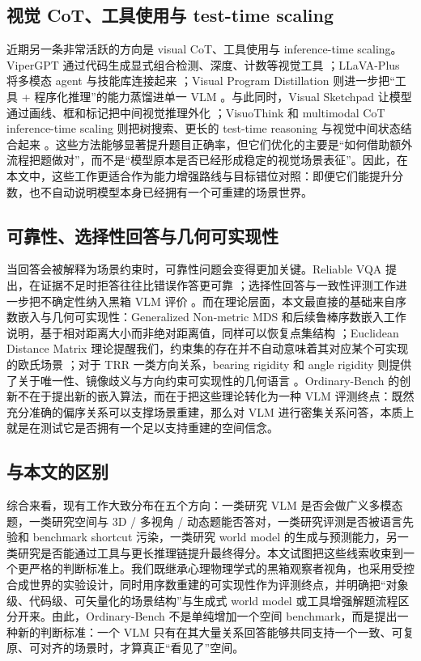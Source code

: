 \subsection{视觉 CoT、工具使用与 test-time scaling}

近期另一条非常活跃的方向是 visual CoT、工具使用与 inference-time scaling。ViperGPT 通过代码生成显式组合检测、深度、计数等视觉工具 \cite{suris2023vipergpt}；LLaVA-Plus 将多模态 agent 与技能库连接起来 \cite{liu2023llavaplus}；Visual Program Distillation 则进一步把“工具 + 程序化推理”的能力蒸馏进单一 VLM \cite{gui2024vpd}。与此同时，Visual Sketchpad 让模型通过画线、框和标记把中间视觉推理外化 \cite{hu2024visualsketchpad}；VisuoThink 和 multimodal CoT inference-time scaling 则把树搜索、更长的 test-time reasoning 与视觉中间状态结合起来 \cite{wang2025visuothink,lin2025multimodalcot}。这些方法能够显著提升题目正确率，但它们优化的主要是“如何借助额外流程把题做对”，而不是“模型原本是否已经形成稳定的视觉场景表征”。因此，在本文中，这些工作更适合作为能力增强路线与目标错位对照：即便它们能提升分数，也不自动说明模型本身已经拥有一个可重建的场景世界。

\subsection{可靠性、选择性回答与几何可实现性}

当回答会被解释为场景约束时，可靠性问题会变得更加关键。Reliable VQA 提出，在证据不足时拒答往往比错误作答更可靠 \cite{whitehead2022reliablevqa}；选择性回答与一致性评测工作进一步把不确定性纳入黑箱 VLM 评价 \cite{eisenschlos2024selectivevqa,khan2024consistency}。而在理论层面，本文最直接的基础来自序数嵌入与几何可实现性：Generalized Non-metric MDS 和后续鲁棒序数嵌入工作说明，基于相对距离大小而非绝对距离值，同样可以恢复点集结构 \cite{agarwal2007gnmds,ma2018robustordinal}；Euclidean Distance Matrix 理论提醒我们，约束集的存在并不自动意味着其对应某个可实现的欧氏场景 \cite{dokmanic2015edm}；对于 TRR 一类方向关系，bearing rigidity 和 angle rigidity 则提供了关于唯一性、镜像歧义与方向约束可实现性的几何语言 \cite{zhao2019bearingrigidity,chen2021anglerigidity}。Ordinary-Bench 的创新不在于提出新的嵌入算法，而在于把这些理论转化为一种 VLM 评测终点：既然充分准确的偏序关系可以支撑场景重建，那么对 VLM 进行密集关系问答，本质上就是在测试它是否拥有一个足以支持重建的空间信念。

\subsection{与本文的区别}

综合来看，现有工作大致分布在五个方向：一类研究 VLM 是否会做广义多模态题，一类研究空间与 3D / 多视角 / 动态题能否答对，一类研究评测是否被语言先验和 benchmark shortcut 污染，一类研究 world model 的生成与预测能力，另一类研究是否能通过工具与更长推理链提升最终得分。本文试图把这些线索收束到一个更严格的判断标准上。我们既继承心理物理学式的黑箱观察者视角，也采用受控合成世界的实验设计，同时用序数重建的可实现性作为评测终点，并明确把“对象级、代码级、可矢量化的场景结构”与生成式 world model 或工具增强解题流程区分开来。由此，Ordinary-Bench 不是单纯增加一个空间 benchmark，而是提出一种新的判断标准：一个 VLM 只有在其大量关系回答能够共同支持一个一致、可复原、可对齐的场景时，才算真正“看见了”空间。
